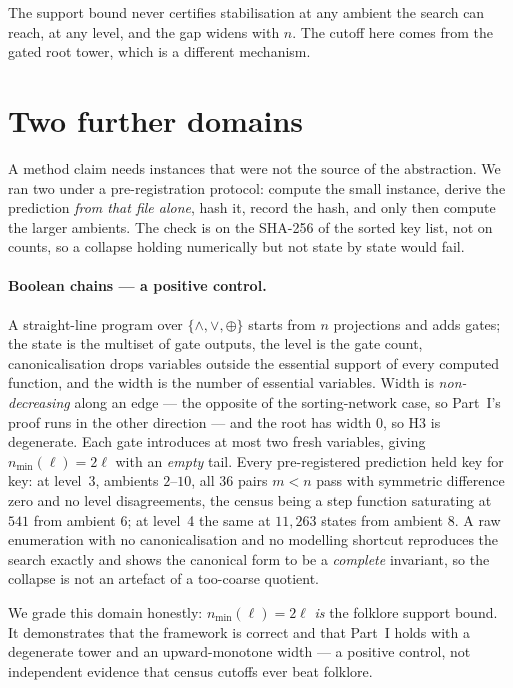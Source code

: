 \documentclass[11pt,a4paper]{article}
\theoremstyle{plain}
\theoremstyle{definition}
\theoremstyle{remark}
\newcommand{\nmin}{n_{\min}}
\begin{document}
The support bound never certifies stabilisation at any ambient the search can
reach, at any level, and the gap widens with $n$. The cutoff here comes from
the gated root tower, which is a different mechanism.

\section{Two further domains}\label{sec:domains}

A method claim needs instances that were not the source of the abstraction. We
ran two under a pre-registration protocol: compute the small instance, derive
the prediction \emph{from that file alone}, hash it, record the hash, and only
then compute the larger ambients. The check is on the SHA-256 of the sorted key
list, not on counts, so a collapse holding numerically but not state by state
would fail.

\paragraph{Boolean chains --- a positive control.}
A straight-line program over $\{\wedge,\vee,\oplus\}$ starts from $n$
projections and adds gates; the state is the multiset of gate outputs, the
level is the gate count, canonicalisation drops variables outside the essential
support of every computed function, and the width is the number of essential
variables. Width is \emph{non-decreasing} along an edge --- the opposite of the
sorting-network case, so Part~I's proof runs in the other direction --- and the
root has width $0$, so H3 is degenerate. Each gate introduces at most two fresh
variables, giving $\nmin(\ell) = 2\ell$ with an \emph{empty} tail. Every
pre-registered prediction held key for key: at level~3, ambients $2$--$10$, all
$36$ pairs $m<n$ pass with symmetric difference zero and no level
disagreements, the census being a step function saturating at $541$ from
ambient $6$; at level~4 the same at $11{,}263$ states from ambient $8$. A raw
enumeration with no canonicalisation and no modelling shortcut reproduces the
search exactly and shows the canonical form to be a \emph{complete} invariant,
so the collapse is not an artefact of a too-coarse quotient.

We grade this domain honestly: $\nmin(\ell) = 2\ell$ \emph{is} the folklore
support bound. It demonstrates that the framework is correct and that Part~I
holds with a degenerate tower and an upward-monotone width --- a positive
control, not independent evidence that census cutoffs ever beat folklore.
\end{document}
